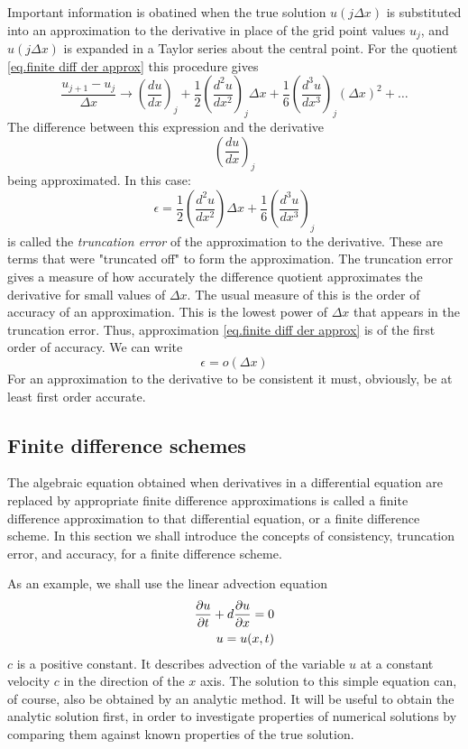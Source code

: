 Important information is obatined when the true solution $u(j\Delta x)$ is substituted into an approximation to the derivative in place of the grid point values $u_j$, and$ u(j\Delta x)$ is expanded in a Taylor series about the central point. For the quotient \ref{eq.finite diff der approx} this procedure gives
\begin{equation}
    \frac{u_{j+1}-u_j}{\Delta x}\rightarrow\left(\frac{du}{dx}\right)_j+\frac{1}{2}\left(\frac{d^2u}{dx^2}\right)_j\Delta x+\frac{1}{6}\left(\frac{d^3u}{dx^3}\right)_j(\Delta x)^2+\dots
\end{equation}
The difference between this expression and the derivative $$\left(\frac{du}{dx}\right)_j$$ being approximated. In this case:
\begin{equation}
    \epsilon= \frac{1}{2}\left(\frac{d^2u}{dx^2}\right)\Delta x+\frac{1}{6}\left(\frac{d^3u}{dx^3}\right)_j
\end{equation}
 is called the \textit{truncation error} of the approximation to the derivative. These are terms that were "truncated off" to form the approximation. The truncation error gives a measure of how accurately the difference quotient approximates the derivative for small values of $\Delta x$. The usual measure of this is the order of accuracy of an approximation. This is the lowest power of $\Delta x$ that appears in the truncation error. Thus, approximation \ref{eq.finite diff der approx}
 is of the first order of accuracy. We can write 
 \begin{equation}
     \epsilon =o(\Delta x)
 \end{equation}
 For an approximation to the derivative to be consistent it must, obviously, be at least first order accurate.
\subsection{Finite difference schemes}
The algebraic equation obtained when derivatives in a differential equation are replaced by appropriate finite difference approximations is called a finite difference approximation to that differential equation, or a finite difference scheme. In this section we shall introduce the concepts of consistency, truncation error, and accuracy, for a finite difference scheme.

As an example, we shall use the linear advection equation
\begin{align}\label{eq:linear adv eq}
        \frac{\partial u}{\partial t}+d\frac{\partial u}{\partial x}=0 \notag \\
         u=u(x,t)
\end{align}
$c$ is a positive constant.
It describes advection of the variable $u$ at a constant velocity $c$ in the direction of the $x$ axis. The solution to this simple equation can, of course, also be obtained by an analytic method. It will be useful to obtain the analytic solution first, in order to investigate properties of numerical solutions by comparing them against known properties of the true solution. 


